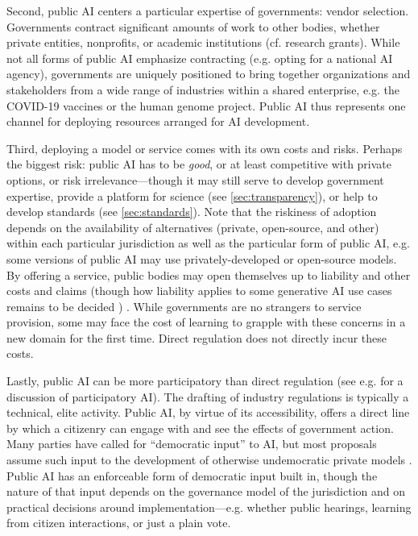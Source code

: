 \documentclass{article}
\begin{document}
Second, public AI centers a particular expertise of governments: vendor selection. Governments contract significant amounts of work to other bodies, whether private entities, nonprofits, or academic institutions (cf. research grants). While not all forms of public AI emphasize contracting (e.g. opting for a national AI agency), governments are uniquely positioned to bring together organizations and stakeholders from a wide range of industries within a shared enterprise, e.g. the COVID-19 vaccines or the human genome project. Public AI thus represents one channel for deploying resources arranged for AI development. 



Third, deploying a model or service comes with its own costs and risks. Perhaps the biggest risk: public AI has to be \emph{good}, or at least competitive with private options, or risk irrelevance---though it may still serve to develop government expertise, provide a platform for science (see \cref{sec:transparency}), or help to develop standards (see \cref{sec:standards}). 
Note that the riskiness of adoption depends on the availability of alternatives (private, open-source, and other) within each particular jurisdiction as well as the particular form of public AI, e.g. some versions of public AI may use privately-developed or open-source models. 
By offering a service, public bodies may open themselves up to liability and other costs and claims (though how liability applies to some generative AI use cases remains to be decided \cite{walshLegalIssuesPresented2023}) . While governments are no strangers to service provision, some may face the cost of learning to grapple with these concerns  in a new domain for the first time. Direct regulation does not directly incur these costs.

Lastly, public AI can be more participatory than direct regulation (see e.g. \citeauthor{delgadoParticipatoryTurnAI2023} \cite{delgadoParticipatoryTurnAI2023} for a discussion of participatory AI). The drafting of industry regulations is typically a technical, elite activity. Public AI, by virtue of its accessibility, offers a direct line by which a citizenry can engage with and see the effects of government action. Many parties have called for ``democratic input'' to AI, but most proposals assume such input to the development of otherwise undemocratic private models \cite{zarembaDemocraticInputsAI2023}. Public AI has an enforceable form of democratic input built in, though the nature of that input depends on the governance model of the jurisdiction and on practical decisions around implementation---e.g. whether public hearings, learning from citizen interactions, or just a plain vote.
\end{document}
